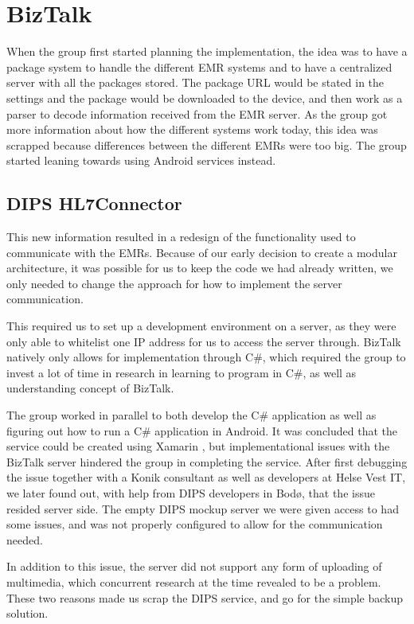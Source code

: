 \section{BizTalk}
\label{biztalk}

When the group first started planning the implementation, the idea was to have a package system to handle the different EMR systems and to have a centralized server with all the packages stored. The package URL would be stated in the settings and the package would be downloaded to the device, and then work as a parser to decode information received from the EMR server. As the group got more information about how the different systems work today, this idea was scrapped because differences between the different EMRs were too big. The group started leaning towards using Android services instead.

\subsection{DIPS HL7Connector}
This new information resulted in a redesign of the functionality used to communicate with the EMRs. Because of our early decision to create a modular architecture, it was possible for us to keep the code we had already written, we only needed to change the approach for how to implement the server communication.

This required us to set up a development environment on a server, as they were only able to whitelist one IP address for us to access the server through. BizTalk natively only allows for implementation through C\#, which required the group to invest a lot of time in research in learning to program in C\#, as well as understanding concept of BizTalk.

The group worked in parallel to both develop the C\# application as well as figuring out how to run a C\# application in Android. It was concluded that the service could be created using Xamarin \cite{xamarin}, but implementational issues with the BizTalk server hindered the group in completing the service. After first debugging the issue together with a Konik consultant as well as developers at Helse Vest IT, we later found out, with help from DIPS developers in Bodø, that the issue resided server side. The empty DIPS mockup server we were given access to had some issues, and was not properly configured to allow for the communication needed.

In addition to this issue, the server did not support any form of uploading of multimedia, which concurrent research at the time revealed to be a problem. These two reasons made us scrap the DIPS service, and go for the simple backup solution.